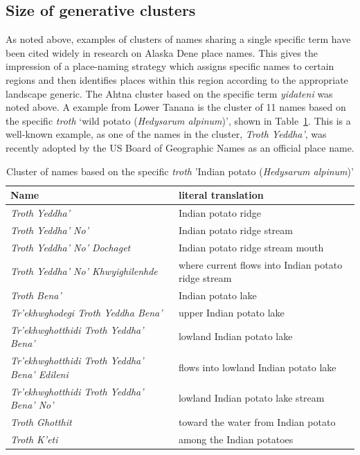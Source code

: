 \subsection{Size of  generative clusters}
As noted above, examples of clusters of names sharing a single specific term have been cited widely in research on Alaska Dene place names.  This gives the impression of a place-naming strategy which assigns specific names to certain regions and then identifies places within this region according to the appropriate landscape generic. The Ahtna cluster based on the specific term \textit{yidateni} was noted above. A example from Lower Tanana is the cluster of 11 names based on the specific \textit{troth} ‘wild potato (\textit{Hedysarum alpinum})’, shown in Table~\ref{holton:tab:troth}. This is a well-known example, as one of the names in the cluster, \textit{Troth Yeddha’}, was recently adopted by the US Board of Geographic Names as an official place name.


\begin{table}[h]
\centering
\caption{Cluster of names based on the specific \textit{troth} 'Indian potato (\textit{Hedysarum alpinum})’}\label{holton:tab:troth}
\small
\begin{tabular}{l | l}
\textbf{Name} & \textbf{literal translation}\\\hline
\textit{Troth Yeddha'} &
Indian potato ridge\\
\textit{Troth Yeddha' No'} &
Indian potato ridge stream\\
\textit{Troth Yeddha' No' Dochaget} &
Indian potato ridge stream mouth\\
\textit{Troth Yeddha' No' Khwyighilenhde} &
where current flows into Indian potato ridge stream\\
\textit{Troth Bena'} &
Indian potato lake \\
\textit{Tr'ekhwghodegi Troth Yeddha Bena'} &
upper Indian potato lake\\
\textit{Tr'ekhwghotthidi Troth Yeddha' Bena'} &
lowland Indian potato lake\\
\textit{Tr'ekhwghotthidi Troth Yeddha' Bena' Edileni} &
flows into lowland Indian potato lake\\
\textit{Tr'ekhwghotthidi Troth Yeddha' Bena' No'} &
lowland Indian potato lake stream\\
\textit{Troth Ghotthit} &
toward the water from Indian potato\\
\textit{Troth K’eti} &
among the Indian potatoes\\
\end{tabular}
\end{table}

